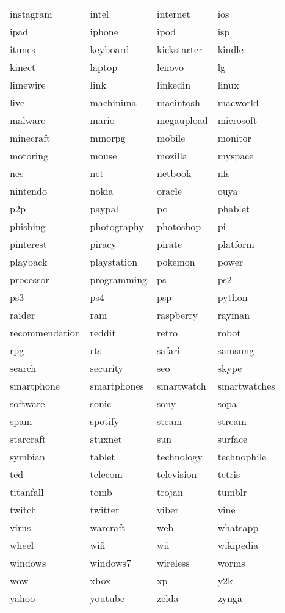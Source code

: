 \documentclass[12pt,a4paper]{report}
\begin{document}
\begin{tabular}{l|l|l|l}
instagram & intel & internet & ios\\
ipad & iphone & ipod & isp\\
itunes & keyboard & kickstarter & kindle\\
kinect & laptop & lenovo & lg\\
limewire & link & linkedin & linux\\
live & machinima & macintosh & macworld\\
malware & mario & megaupload & microsoft\\
minecraft & mmorpg & mobile & monitor\\
motoring & mouse & mozilla & myspace\\
nes & net & netbook & nfs\\
nintendo & nokia & oracle & ouya\\
p2p & paypal & pc & phablet\\
phishing & photography & photoshop & pi\\
pinterest & piracy & pirate & platform\\
playback & playstation & pokemon & power\\
processor & programming & ps & ps2\\
ps3 & ps4 & psp & python\\
raider & ram & raspberry & rayman\\
recommendation & reddit & retro & robot\\
rpg & rts & safari & samsung\\
search & security & seo & skype\\
smartphone & smartphones & smartwatch & smartwatches\\
software & sonic & sony & sopa\\
spam & spotify & steam & stream\\
starcraft & stuxnet & sun & surface\\
symbian & tablet & technology & technophile\\
ted & telecom & television & tetris\\
titanfall & tomb & trojan & tumblr\\
twitch & twitter & viber & vine\\
virus & warcraft & web & whatsapp\\
wheel & wifi & wii & wikipedia\\
windows & windows7 & wireless & worms\\
wow & xbox & xp & y2k\\
yahoo & youtube & zelda & zynga\\

\end{tabular}

	
	
\end{document}
